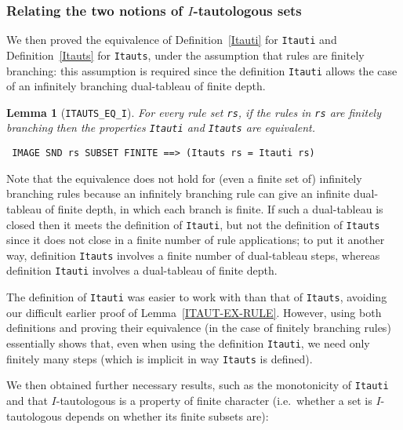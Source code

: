 \documentclass[a4paper]{article}
\newtheorem{lemma}{Lemma}
\begin{document}
\subsubsection{Relating the two notions of $I$-tautologous sets}
\label{Itauti-Itauts}

We then proved the equivalence of 
Definition~\ref{Itauti} for \texttt{Itauti} and
Definition~\ref{Itauts} for \texttt{Itauts},
under the assumption that rules are finitely branching:
this assumption is required since the definition \texttt{Itauti}
allows the case of an infinitely branching dual-tableau of finite depth.

\begin{lemma}[\texttt{ITAUTS\_EQ\_I}] \label{ITAUTS-EQ-I}
For every rule set \texttt{rs},
if the rules in \texttt{rs} are finitely branching then
the properties \texttt{Itauti} and \texttt{Itauts} are equivalent.
\end{lemma}
\begin{verbatim}
 IMAGE SND rs SUBSET FINITE ==> (Itauts rs = Itauti rs)
\end{verbatim}
  
Note that the equivalence does not hold for (even a finite set of)
infinitely branching rules because an infinitely branching rule can
give an infinite dual-tableau of finite depth, in which each branch is
finite.  If such a dual-tableau is closed then it meets the definition of
\texttt{Itauti}, but not the definition of \texttt{Itauts} since it
does not close in a finite number of rule applications; to put it
another way, definition \texttt{Itauts} involves a finite number of
dual-tableau steps, whereas definition \texttt{Itauti} involves a dual-tableau
of finite depth.

The definition of \texttt{Itauti} was easier to work with than that of
\texttt{Itauts}, avoiding our difficult earlier proof of 
Lemma~\ref{ITAUT-EX-RULE}.
However, using both definitions and proving their equivalence
(in the case of finitely branching rules) essentially shows that,
even when using the definition \texttt{Itauti}, we need only finitely many steps
(which is implicit in way \texttt{Itauts} is defined).

We then obtained further necessary results, such as the monotonicity
of \texttt{Itauti} and that $I$-tautologous is a property of finite
character (i.e.\ whether a set is $I$-tautologous depends on whether its
finite subsets are):
\end{document}
